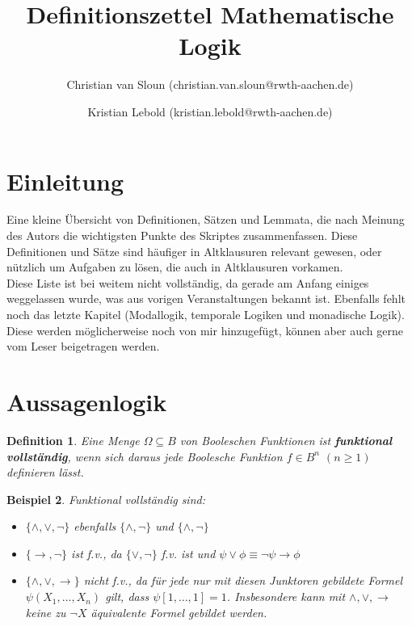 \documentclass[12pt,a4paper]{article}
\author{Christian van Sloun (christian.van.sloun@rwth-aachen.de) \and Kristian Lebold (kristian.lebold@rwth-aachen.de)}
\title{Definitionszettel Mathematische Logik}
\newtheorem{defi}{Definition}[section]
\newtheorem{bsp}[defi]{Beispiel}
\begin{document}
	\newcommand{\AL}{\textsc{AL}}
	\newcommand{\A}{\mathfrak{A}}
	\newcommand{\B}{\mathfrak{B}}
	\newcommand{\FO}{\textsc{FO}(\tau)}
	\newcommand{\Th}[1]{\textsl{Th}(#1)}
	
	\maketitle
	\tableofcontents

\section*{Einleitung}
Eine kleine Übersicht von Definitionen, Sätzen und Lemmata, die nach Meinung des Autors die wichtigsten Punkte des Skriptes zusammenfassen. Diese Definitionen und Sätze sind häufiger in Altklausuren relevant gewesen, oder nützlich um Aufgaben zu lösen, die auch in Altklausuren vorkamen.\\

Diese Liste ist bei weitem nicht vollständig, da gerade am Anfang einiges weggelassen wurde, was aus vorigen Veranstaltungen bekannt ist. Ebenfalls fehlt noch das letzte Kapitel (Modallogik, temporale Logiken und monadische Logik). Diese werden möglicherweise noch von mir hinzugefügt, können aber auch gerne vom Leser beigetragen werden.

\newpage
\section{Aussagenlogik}
	\begin{defi}
		Eine Menge $\Omega\subseteq B$ von Booleschen Funktionen ist \textbf{funktional vollständig}, wenn sich daraus jede Boolesche Funktion $f\in B^n$ $(n\ge 1)$ definieren lässt.
	\end{defi}
	\begin{bsp}
		Funktional vollständig sind:
		\begin{itemize}
			\item $\lbrace\wedge, \vee, \neg\rbrace$ ebenfalls $\lbrace\wedge, \neg\rbrace$ und $\lbrace\wedge, \neg\rbrace$
			\item $\lbrace\rightarrow, \neg\rbrace$ ist f.v., da $\lbrace\vee, \neg\rbrace$ f.v. ist und $\psi\vee\phi\equiv\neg\psi\rightarrow\phi$
			\item $\lbrace\wedge,\vee,\rightarrow\rbrace$ nicht f.v., da für jede nur mit diesen Junktoren gebildete Formel $\psi\left(X_1,\dots,X_n\right)$ gilt, dass $\psi\left[1,\dots,1\right]=1$. Insbesondere kann mit $\wedge,\vee,\rightarrow$ keine zu $\neg X$ äquivalente Formel gebildet werden.
		\end{itemize}
	\end{bsp}
\end{document}
